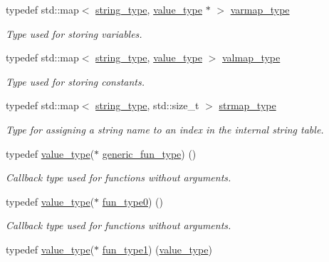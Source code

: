 \begin{DoxyCompactItemize}
typedef std\+::map$<$ \hyperlink{namespacemu_ae9f8b44d9a97dd397180891e8390c3e9}{string\+\_\+type}, \hyperlink{namespacemu_a17d4f113a4b88b8d971cca8ddbbe8a47}{value\+\_\+type} $\ast$ $>$ \hyperlink{namespacemu_ab57755354e948a664ad94d38546dbb10}{varmap\+\_\+type}
\begin{DoxyCompactList}\small\item\em Type used for storing variables. \end{DoxyCompactList}\item 
typedef std\+::map$<$ \hyperlink{namespacemu_ae9f8b44d9a97dd397180891e8390c3e9}{string\+\_\+type}, \hyperlink{namespacemu_a17d4f113a4b88b8d971cca8ddbbe8a47}{value\+\_\+type} $>$ \hyperlink{namespacemu_a5940d281286a01342cf773f74481843c}{valmap\+\_\+type}
\begin{DoxyCompactList}\small\item\em Type used for storing constants. \end{DoxyCompactList}\item 
typedef std\+::map$<$ \hyperlink{namespacemu_ae9f8b44d9a97dd397180891e8390c3e9}{string\+\_\+type}, std\+::size\+\_\+t $>$ \hyperlink{namespacemu_aea1c20093e51d3dc13de10f3c17ae5b1}{strmap\+\_\+type}
\begin{DoxyCompactList}\small\item\em Type for assigning a string name to an index in the internal string table. \end{DoxyCompactList}\item 
typedef \hyperlink{namespacemu_a17d4f113a4b88b8d971cca8ddbbe8a47}{value\+\_\+type}($\ast$ \hyperlink{namespacemu_ae289766395042975b51dda382cccc907}{generic\+\_\+fun\+\_\+type}) ()
\begin{DoxyCompactList}\small\item\em Callback type used for functions without arguments. \end{DoxyCompactList}\item 
typedef \hyperlink{namespacemu_a17d4f113a4b88b8d971cca8ddbbe8a47}{value\+\_\+type}($\ast$ \hyperlink{namespacemu_af74b1b05cca11b94eb7a478c6c1f8200}{fun\+\_\+type0}) ()
\begin{DoxyCompactList}\small\item\em Callback type used for functions without arguments. \end{DoxyCompactList}\item 
typedef \hyperlink{namespacemu_a17d4f113a4b88b8d971cca8ddbbe8a47}{value\+\_\+type}($\ast$ \hyperlink{namespacemu_affeaec09801b502b9955d7248b7e2706}{fun\+\_\+type1}) (\hyperlink{namespacemu_a17d4f113a4b88b8d971cca8ddbbe8a47}{value\+\_\+type})

\end{DoxyCompactItemize}
